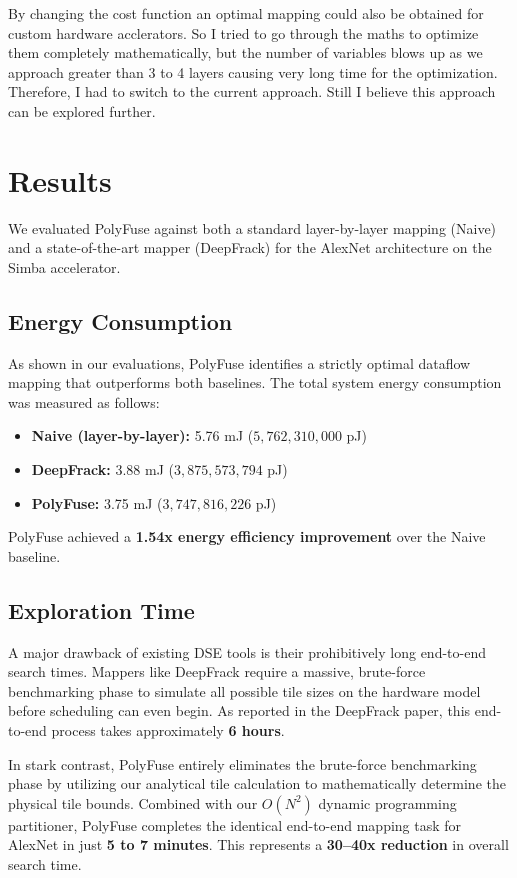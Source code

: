 \documentclass[conference]{IEEEtran}
\begin{document}
By changing the cost function an optimal mapping could also be obtained for custom hardware acclerators. So I tried to go through the maths to optimize them completely mathematically, but the number of variables blows up as we approach greater than 3 to 4 layers causing very long time for the optimization. Therefore, I had to switch to the current approach. Still I believe this approach can be explored further.

\section{Results}
We evaluated PolyFuse against both a standard layer-by-layer mapping (Naive) and a state-of-the-art mapper (DeepFrack) for the AlexNet architecture on the Simba accelerator. 

\subsection{Energy Consumption}
As shown in our evaluations, PolyFuse identifies a strictly optimal dataflow mapping that outperforms both baselines. The total system energy consumption was measured as follows:
\begin{itemize}
    \item \textbf{Naive (layer-by-layer):} 5.76 mJ ($5,762,310,000$ pJ)
    \item \textbf{DeepFrack:} 3.88 mJ ($3,875,573,794$ pJ)
    \item \textbf{PolyFuse:} 3.75 mJ ($3,747,816,226$ pJ)
\end{itemize}
PolyFuse achieved a \textbf{1.54x energy efficiency improvement} over the Naive baseline.

\subsection{Exploration Time}
A major drawback of existing DSE tools is their prohibitively long end-to-end search times. Mappers like DeepFrack require a massive, brute-force benchmarking phase to simulate all possible tile sizes on the hardware model before scheduling can even begin. As reported in the DeepFrack paper, this end-to-end process takes approximately \textbf{6 hours}. 

In stark contrast, PolyFuse entirely eliminates the brute-force benchmarking phase by utilizing our analytical tile calculation to mathematically determine the physical tile bounds. Combined with our $O(N^2)$ dynamic programming partitioner, PolyFuse completes the identical end-to-end mapping task for AlexNet in just \textbf{5 to 7 minutes}. This represents a \textbf{30--40x reduction} in overall search time.
\end{document}
